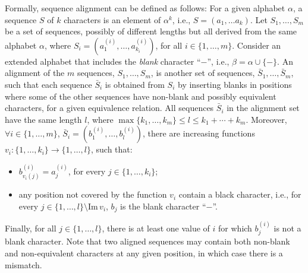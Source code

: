 Formally, sequence alignment can be defined as follows:
For a given alphabet $\alpha$, a sequence $S$ of $k$ characters is an element of
$\alpha^k$, i.e., $S = (a_1, \ldots a_k)$.
Let $S_1, \ldots, S_m$ be a set of sequences, possibly of different lengths but
all derived from the same alphabet $\alpha$, where
$S_i = (a_1^{(i)}, \ldots, a_{k_i}^{(i)})$, for all $i\in\{1,\ldots,m\}$.
Consider an extended alphabet that includes the \textit{blank} character ``$-$'',
i.e., $\beta = \alpha \cup \{-\}$.
An alignment of the $m$ sequences, $S_1, \ldots, S_m$, is another set of sequences,
$\bar{S}_1, \ldots, \bar{S}_m$, such that each sequence $\bar{S}_i$ is obtained
from $S_i$ by inserting blanks in positions where some of the other sequences
have non-blank and possibly equivalent characters, for a given equivalence relation.
All sequences $\bar{S}_i$ in the alignment set have the same length $l$, where
$\max\{k_1,\ldots,k_m\} \leq l \leq k_1 + \cdots + k_m$.
Moreover, $\forall i\in\{1,\ldots, m\}$, $\bar{S}_i = (b_1^{(i)},\ldots,b_l^{(i)})$,
there are increasing functions $v_i: \{1,\ldots,k_i\} \to \{1,\ldots,l\}$, such that:
\begin{itemize}
\item $b_{v_i(j)}^{(i)} = a_j^{(i)}$, for every $j \in \{1,\ldots,k_i\}$;
\item any position not covered by the function $v_i$ contain a black character, i.e., for every $j \in \{1,\ldots,l\}\setminus \textrm{Im} \, v_i$, $b_j$ is the blank character ``$-$''.
\end{itemize}
Finally, for all $j\in\{1,\ldots,l\}$, there is at least one value of $i$ for
which $b_j^{(i)}$ is not a blank character.
Note that two aligned sequences may contain both non-blank and non-equivalent characters at any given position, in which case there is a mismatch.


